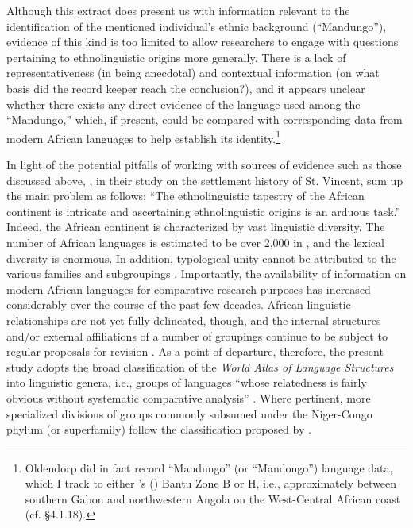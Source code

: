 \documentclass[output=paper,colorlinks,citecolor=brown]{langscibook}
\begin{document}
Although this extract does present us with information relevant to the identification of the mentioned individual’s ethnic background (``Mandungo''), evidence of this kind is too limited to allow researchers to engage with questions pertaining to ethnolinguistic origins more generally. There is a lack of representativeness (in being anecdotal) and contextual information (on what basis did the record keeper reach the conclusion?), and it appears unclear whether there exists any direct evidence of the language used among the ``Mandungo,'' which, if present, could be compared with corresponding data from modern African languages to help establish its identity.\footnote{Oldendorp did in fact record ``Mandungo'' (or ``Mandongo'') language data, which I track to either \citeauthor{Guthrie_1948}'s (\citeyear{Guthrie_1948}) Bantu Zone B or H, i.e., approximately between southern Gabon and northwestern Angola on the West-Central African coast (cf. §4.1.18).} 

In light of the potential pitfalls of working with sources of evidence such as those discussed above, \citet[6]{Prescod_Fraser_2015}, in their study on the settlement history of St. Vincent, sum up the main problem as follows: ``The ethnolinguistic tapestry of the African continent is intricate and ascertaining ethnolinguistic origins is an arduous task.'' Indeed, the African continent is characterized by vast linguistic diversity. The number of African languages is estimated to be over 2,000 in \citet{Eberhard_Simons_Fenning_2019}, and the lexical diversity is enormous. In addition, typological unity cannot be attributed to the various families and subgroupings \citep[e.g.,][]{Boegh2016}. Importantly, the availability of information on modern African languages for comparative research purposes has increased considerably over the course of the past few decades. African linguistic relationships are not yet fully delineated, though, and the internal structures and/or external affiliations of a number of groupings continue to be subject to regular proposals for revision \citep[see, e.g.,][]{Guldemann_2018}. As a point of departure, therefore, the present study adopts the broad classification of the \emph{World Atlas of Language Structures} \citep{Dryer_Haspelmath_2013} into linguistic genera, i.e., groups of languages ``whose relatedness is fairly obvious without systematic comparative analysis'' \citep[584]{Dryer_2005}. Where pertinent, more specialized divisions of groups commonly subsumed under the Niger-Congo phylum (or superfamily) follow the classification proposed by \citet[18]{Williamson_Blench_200}.
\end{document}
